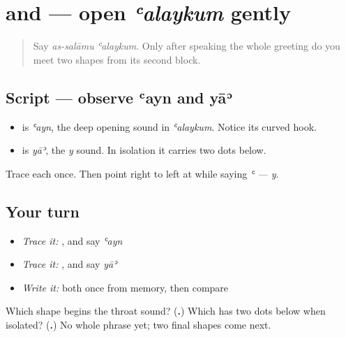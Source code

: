 \section[\texorpdfstring{\ar{ع} \ar{ي} (ʿayn, yāʾ)}{ع ي (ʿayn, yāʾ)}]{ and  — open \emph{ʿalaykum} gently}

\label{lesson:AR-W00-ayn-ya}



\begin{quote}
Say \emph{as-salāmu ʿalaykum}. Only after speaking the whole greeting do you meet two shapes from its second block.
\end{quote}

\subsection*{Script — observe ʿayn and yāʾ}

\begin{itemize}
\raggedright
  \item \textbf{} is \emph{ʿayn}, the deep opening sound in \emph{ʿalaykum}. Notice its curved hook.
  \item \textbf{} is \emph{yāʾ}, the \emph{y} sound. In isolation it carries two dots below.
\end{itemize}

Trace each once. Then point right to left at \textbf{ } while saying \emph{ʿ — y}.

\subsection*{Your turn}
\begin{itemize}
\raggedright
  \item \emph{Trace it:} \textbf{}, and say \emph{ʿayn}
  \item \emph{Trace it:} \textbf{}, and say \emph{yāʾ}
  \item \emph{Write it:} both once from memory, then compare
\end{itemize}

\begin{tcolorbox}[breakable,colback=teal!4,colframe=teal!35!black,title={Before you move on}]
Which shape begins the throat sound? (\textbf{.}) Which has two dots below when isolated? (\textbf{.}) No whole phrase yet; two final shapes come next.
\end{tcolorbox}
